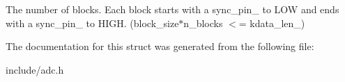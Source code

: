 The number of blocks. Each block starts with a sync\+\_\+pin\+\_\+ to L\+OW and ends with a sync\+\_\+pin\+\_\+ to H\+I\+GH. (block\+\_\+size$\ast$n\+\_\+blocks $<$= kdata\+\_\+len\+\_\+) 

The documentation for this struct was generated from the following file\+:\begin{DoxyCompactItemize}
\item 
include/adc.\+h\end{DoxyCompactItemize}
